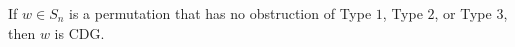 \begin{theorem}\label{thm:if}
If $w \in S_n$ is a permutation that has no obstruction of Type $1$, Type  $2$, or Type $3$, then $w$ is CDG.
\end{theorem}
